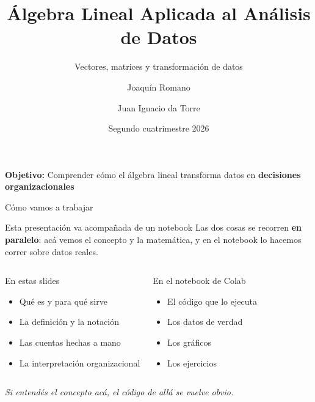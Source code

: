 \documentclass[aspectratio=169,10pt]{beamer}
\title{Álgebra Lineal Aplicada al Análisis de Datos}
\subtitle{Vectores, matrices y transformación de datos}
\author{Joaquín Romano \and Juan Ignacio da Torre}
\institute{
    Laboratorio de Métodos Cuantitativos Aplicados a la Gestión \\
    Universidad de Buenos Aires
}
\date{Segundo cuatrimestre 2026}
\begin{document}
\begin{frame}
\titlepage
\vspace{-0.5cm}
\begin{center}
\textbf{Objetivo:} Comprender cómo el álgebra lineal transforma datos en \textbf{decisiones organizacionales}
\end{center}
\end{frame}

\begin{frame}{Cómo vamos a trabajar}

\begin{block}{Esta presentación va acompañada de un notebook}
Las dos cosas se recorren \textbf{en paralelo}: acá vemos el concepto y la matemática,
y en el notebook lo hacemos correr sobre datos reales.
\end{block}

\vspace{0.4cm}

\begin{columns}[T]
\begin{exampleblock}{En estas slides}
\begin{itemize}
    \item Qué es y para qué sirve
    \item La definición y la notación
    \item Las cuentas hechas a mano
    \item La interpretación organizacional
\end{itemize}
\end{exampleblock}

\begin{alertblock}{En el notebook de Colab}
\begin{itemize}
    \item El código que lo ejecuta
    \item Los datos de verdad
    \item Los gráficos
    \item Los ejercicios
\end{itemize}
\end{alertblock}
\end{columns}

\vspace{0.4cm}
\begin{center}
\textit{Si entendés el concepto acá, el código de allá se vuelve obvio.}
\end{center}
\end{frame}
\end{document}
